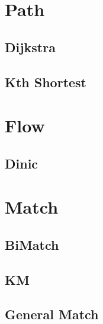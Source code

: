 \documentclass[10pt,twocolumn,oneside]{article}
\begin{document}
    \section{Path}
    \subsection{Dijkstra}
    \subsection{Kth Shortest}
    

    \section{Flow}
    \subsection{Dinic}
    

    \section{Match}
    \subsection{BiMatch}
    
    \subsection{KM}
    
    \subsection{General Match}
    
\end{document}
